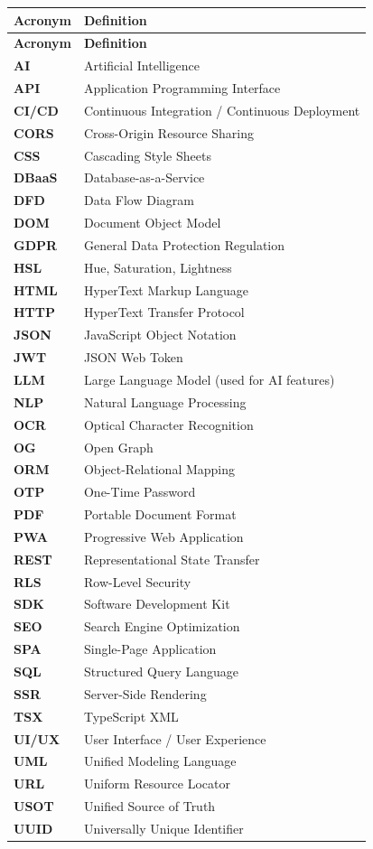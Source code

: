 \documentclass[12pt,a4paper,oneside]{report}
\begin{document}
\begin{longtable}{|>{\bfseries}p{3cm}|p{10cm}|}
\hline
\textbf{Acronym} & \textbf{Definition} \\
\hline
\endfirsthead
\hline
\textbf{Acronym} & \textbf{Definition} \\
\hline
\endhead
AI & Artificial Intelligence \\ \hline
API & Application Programming Interface \\ \hline
CI/CD & Continuous Integration / Continuous Deployment \\ \hline
CORS & Cross-Origin Resource Sharing \\ \hline
CSS & Cascading Style Sheets \\ \hline
DBaaS & Database-as-a-Service \\ \hline
DFD & Data Flow Diagram \\ \hline
DOM & Document Object Model \\ \hline
GDPR & General Data Protection Regulation \\ \hline
HSL & Hue, Saturation, Lightness \\ \hline
HTML & HyperText Markup Language \\ \hline
HTTP & HyperText Transfer Protocol \\ \hline
JSON & JavaScript Object Notation \\ \hline
JWT & JSON Web Token \\ \hline
LLM & Large Language Model (used for AI features) \\ \hline
NLP & Natural Language Processing \\ \hline
OCR & Optical Character Recognition \\ \hline
OG & Open Graph \\ \hline
ORM & Object-Relational Mapping \\ \hline
OTP & One-Time Password \\ \hline
PDF & Portable Document Format \\ \hline
PWA & Progressive Web Application \\ \hline
REST & Representational State Transfer \\ \hline
RLS & Row-Level Security \\ \hline
SDK & Software Development Kit \\ \hline
SEO & Search Engine Optimization \\ \hline
SPA & Single-Page Application \\ \hline
SQL & Structured Query Language \\ \hline
SSR & Server-Side Rendering \\ \hline
TSX & TypeScript XML \\ \hline
UI/UX & User Interface / User Experience \\ \hline
UML & Unified Modeling Language \\ \hline
URL & Uniform Resource Locator \\ \hline
USOT & Unified Source of Truth \\ \hline
UUID & Universally Unique Identifier \\ \hline
\end{longtable}
\end{document}
